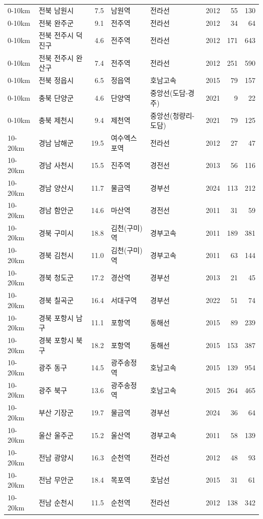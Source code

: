 \begin{tabular}{llrllrrr}
0-10km & 전북 남원시 & 7.5 & 남원역 & 전라선 & 2012 & 55 & 130\\
0-10km & 전북 완주군 & 9.1 & 전주역 & 전라선 & 2012 & 34 & 64\\
0-10km & 전북 전주시 덕진구 & 4.6 & 전주역 & 전라선 & 2012 & 171 & 643\\
0-10km & 전북 전주시 완산구 & 7.4 & 전주역 & 전라선 & 2012 & 251 & 590\\
0-10km & 전북 정읍시 & 6.5 & 정읍역 & 호남고속 & 2015 & 79 & 157\\
0-10km & 충북 단양군 & 4.6 & 단양역 & 중앙선(도담-경주) & 2021 & 9 & 22\\
0-10km & 충북 제천시 & 9.4 & 제천역 & 중앙선(청량리-도담) & 2021 & 79 & 125\\
10-20km & 경남 남해군 & 19.5 & 여수엑스포역 & 전라선 & 2012 & 27 & 47\\
10-20km & 경남 사천시 & 15.5 & 진주역 & 경전선 & 2013 & 56 & 116\\
10-20km & 경남 양산시 & 11.7 & 물금역 & 경부선 & 2024 & 113 & 212\\
10-20km & 경남 함안군 & 14.6 & 마산역 & 경전선 & 2011 & 31 & 59\\
10-20km & 경북 구미시 & 18.8 & 김천(구미)역 & 경부고속 & 2011 & 189 & 381\\
10-20km & 경북 김천시 & 11.0 & 김천(구미)역 & 경부고속 & 2011 & 63 & 144\\
10-20km & 경북 청도군 & 17.2 & 경산역 & 경부선 & 2013 & 21 & 45\\
10-20km & 경북 칠곡군 & 16.4 & 서대구역 & 경부선 & 2022 & 51 & 74\\
10-20km & 경북 포항시 남구 & 11.1 & 포항역 & 동해선 & 2015 & 89 & 239\\
10-20km & 경북 포항시 북구 & 18.2 & 포항역 & 동해선 & 2015 & 153 & 387\\
10-20km & 광주 동구 & 14.5 & 광주송정역 & 호남고속 & 2015 & 139 & 954\\
10-20km & 광주 북구 & 13.6 & 광주송정역 & 호남고속 & 2015 & 264 & 465\\
10-20km & 부산 기장군 & 19.7 & 물금역 & 경부선 & 2024 & 36 & 64\\
10-20km & 울산 울주군 & 15.2 & 울산역 & 경부고속 & 2011 & 58 & 139\\
10-20km & 전남 광양시 & 16.3 & 순천역 & 전라선 & 2012 & 48 & 93\\
10-20km & 전남 무안군 & 18.4 & 목포역 & 호남선 & 2015 & 31 & 61\\
10-20km & 전남 순천시 & 11.5 & 순천역 & 전라선 & 2012 & 138 & 342\\

\end{tabular}
